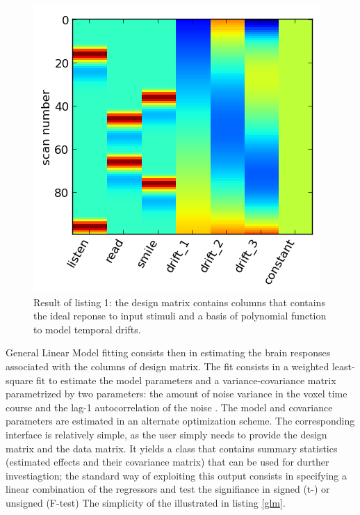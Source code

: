 \documentclass{bioinfo}
\begin{document}
\begin{widetext}

\end{widetext}
\begin{figure}
\begin{center}
\includegraphics[width=.8\linewidth]{dmtx.png}
\end{center}
\caption{ Result of listing 1: the design matrix contains columns that
  contains the ideal reponse to input stimuli and a basis of
  polynomial function to model temporal drifts.}
\label{fig:dmtx}
\end{figure}


General Linear Model fitting consists then in estimating the brain
responses associated with the columns of design matrix.
%
The fit consists in a weighted least-square fit to estimate the model
parameters and a variance-covariance matrix parametrized by two
parameters: the amount of noise variance in the voxel time course and
the lag-1 autocorrelation of the noise \cite{Bullmore1996}. 
%
The model and covariance parameters are estimated in an alternate
optimization scheme.
%
The corresponding interface is relatively simple, as the user simply
needs to provide the design matrix and the data matrix. 
%
It yields a class that contains summary statistics (estimated effects
and their covariance matrix) that can be used for durther
investiagtion; the standard way of exploiting this output consists in
specifying a linear combination of the regressors and test the
signifiance in signed (t-) or unsigned (F-test)
%
The simplicity of the illustrated in listing \ref{glm}.
\end{document}
